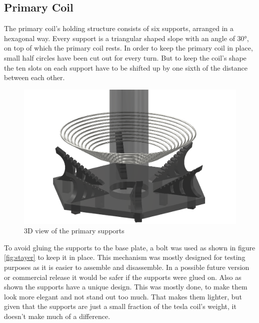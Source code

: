 \subsection{Primary Coil}

The primary coil's holding structure consists of six supports, arranged in a hexagonal way. Every support is a triangular shaped slope with an angle of 30°, on top of which the primary coil rests. In order to keep the primary coil in place, small half circles have been cut out for every turn. But to keep the coil's shape the ten slots on each support have to be shifted up by one sixth of the distance between each other.

\begin{figure}[h!]
    \centering
    \includegraphics[width=1\textwidth]{kassandra/resources/endeMeinerHoffnung.png}
    \caption{3D view of the primary supports}
    \label{fig:primary-supports}
\end{figure}

To avoid gluing the supports to the base plate, a bolt was used as shown in figure \ref{fig:stayer} to keep it in place. This mechanism was mostly designed for testing purposes as it is easier to assemble and disassemble. In a possible future version or commercial release it would be safer if the supports were glued on. Also as shown the supports have a unique design. This was mostly done, to make them look more elegant and not stand out too much. That makes them lighter, but given that the supports are just a small fraction of the tesla coil's weight, it doesn't make much of a difference.

